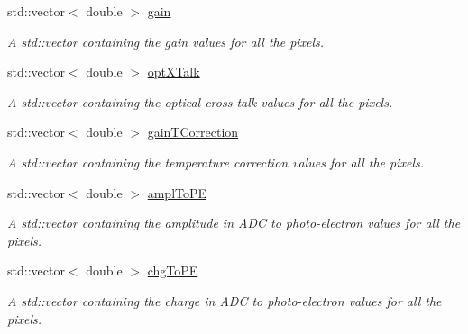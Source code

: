 \begin{DoxyCompactItemize}
\item 
\mbox{\label{classISiPM_a0e6e60edfd0ae916061f377d6aa0dee7}} 
std\+::vector$<$ double $>$ \hyperlink{classISiPM_a0e6e60edfd0ae916061f377d6aa0dee7}{gain}
\begin{DoxyCompactList}\small\item\em A std\+::vector containing the gain values for all the pixels. \end{DoxyCompactList}\item 
\mbox{\label{classISiPM_a884d52c009e94d0b14f2433047426de2}} 
std\+::vector$<$ double $>$ \hyperlink{classISiPM_a884d52c009e94d0b14f2433047426de2}{opt\+X\+Talk}
\begin{DoxyCompactList}\small\item\em A std\+::vector containing the optical cross-\/talk values for all the pixels. \end{DoxyCompactList}\item 
\mbox{\label{classISiPM_aa7646f6c5d67cbac967c6a74c921c4f7}} 
std\+::vector$<$ double $>$ \hyperlink{classISiPM_aa7646f6c5d67cbac967c6a74c921c4f7}{gain\+T\+Correction}
\begin{DoxyCompactList}\small\item\em A std\+::vector containing the temperature correction values for all the pixels. \end{DoxyCompactList}\item 
\mbox{\label{classISiPM_a0ada2f9e52daf574c77557c8ab634034}} 
std\+::vector$<$ double $>$ \hyperlink{classISiPM_a0ada2f9e52daf574c77557c8ab634034}{ampl\+To\+PE}
\begin{DoxyCompactList}\small\item\em A std\+::vector containing the amplitude in A\+DC to photo-\/electron values for all the pixels. \end{DoxyCompactList}\item 
\mbox{\label{classISiPM_a8959e99d36d6ebcab0e17ebc0aa533b5}} 
std\+::vector$<$ double $>$ \hyperlink{classISiPM_a8959e99d36d6ebcab0e17ebc0aa533b5}{chg\+To\+PE}
\begin{DoxyCompactList}\small\item\em A std\+::vector containing the charge in A\+DC to photo-\/electron values for all the pixels. \end{DoxyCompactList}\end{DoxyCompactItemize}


